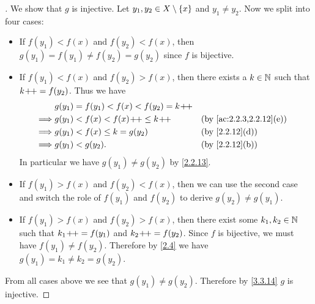 \begin{proof}[]
	We show that \(g\) is injective.
	Let \(y_1, y_2 \in X \setminus \left\lbrace x\right\rbrace\) and \(y_1 \neq y_2\).
	Now we split into four cases:
	\begin{itemize}
		\item If \(f(y_1) < f(x)\) and \(f(y_2) < f(x)\), then \(g(y_1) = f(y_1) \neq f(y_2) = g(y_2)\) since \(f\) is bijective.
		\item If \(f(y_1) < f(x)\) and \(f(y_2) > f(x)\), then there exists a \(k \in \mathbb{N}\) such that \(k\!+\!\!+ = f(y_2)\).
		      Thus we have
		      \begin{align*}
			               & g(y_1) = f(y_1) < f(x) < f(y_2) = k\pp                              \\
			      \implies & g(y_1) < f(x) < f(x)\pp \leq k\pp      &  & \by{ac:2.2.3,2.2.12}[e] \\
			      \implies & g(y_1) < f(x) \leq k = g(y_2)          &  & \by{2.2.12}[d]          \\
			      \implies & g(y_1) < g(y_2).                       &  & \by{2.2.12}[b]
		      \end{align*}
		      In particular we have \(g(y_1) \neq g(y_2)\) by \cref{2.2.13}.
		\item If \(f(y_1) > f(x)\) and \(f(y_2) < f(x)\), then we can use the second case and switch the role of \(f(y_1)\) and \(f(y_2)\) to derive \(g(y_2) \neq g(y_1)\).
		\item If \(f(y_1) > f(x)\) and \(f(y_2) > f(x)\), then there exist some \(k_1, k_2 \in \mathbb{N}\) such that \(k_1\!+\!\!+ = f(y_1)\) and \(k_2\!+\!\!+ = f(y_2)\).
		      Since \(f\) is bijective, we must have \(f(y_1) \neq f(y_2)\).
		      Therefore by \cref{2.4} we have \(g(y_1) = k_1 \neq k_2 = g(y_2)\).
	\end{itemize}
	From all cases above we see that \(g(y_1) \neq g(y_2)\).
	Therefore by \cref{3.3.14} \(g\) is injective.


\end{proof}
